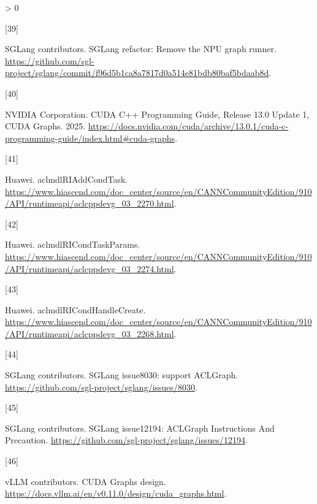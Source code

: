 \documentclass[
  UTF8,
  zihao=5]{ctexart}
\newlength{\cslhangindent}
\newlength{\csllabelwidth}
\newenvironment{CSLReferences}[2] %
 {%
  \setlength{\parindent}{0pt}
  \ifodd #1 \everypar{\setlength{\hangindent}{\cslhangindent}}\ignorespaces\fi
  \ifnum #2 > 0
  \setlength{\parskip}{#2\baselineskip}
  \fi
 }%
 {}
\newcommand{\CSLLeftMargin}[1]{\parbox[t]{\csllabelwidth}{#1}}
\newcommand{\CSLRightInline}[1]{\parbox[t]{\linewidth - \csllabelwidth}{#1}\par}
\begin{document}
\begin{CSLReferences}{0}{0}
\leavevmode{}%
\CSLLeftMargin{{[}39{]} }%
\CSLRightInline{SGLang contributors. {SGLang refactor: Remove the NPU
graph runner}.
\url{https://github.com/sgl-project/sglang/commit/f96d5b1ca8a7817d0a514e81bdb80baf5bdaab8d}.}

\leavevmode{}%
\CSLLeftMargin{{[}40{]} }%
\CSLRightInline{NVIDIA Corporation. CUDA C++ Programming Guide, Release
13.0 Update 1, CUDA Graphs. 2025.
\url{https://docs.nvidia.com/cuda/archive/13.0.1/cuda-c-programming-guide/index.html\#cuda-graphs}.}

\leavevmode{}%
\CSLLeftMargin{{[}41{]} }%
\CSLRightInline{Huawei. {aclmdlRIAddCondTask}.
\url{https://www.hiascend.com/doc_center/source/en/CANNCommunityEdition/910/API/runtimeapi/aclcppdevg_03_2270.html}.}

\leavevmode{}%
\CSLLeftMargin{{[}42{]} }%
\CSLRightInline{Huawei. {aclmdlRICondTaskParams}.
\url{https://www.hiascend.com/doc_center/source/en/CANNCommunityEdition/910/API/runtimeapi/aclcppdevg_03_2274.html}.}

\leavevmode{}%
\CSLLeftMargin{{[}43{]} }%
\CSLRightInline{Huawei. {aclmdlRICondHandleCreate}.
\url{https://www.hiascend.com/doc_center/source/en/CANNCommunityEdition/910/API/runtimeapi/aclcppdevg_03_2268.html}.}

\leavevmode{}%
\CSLLeftMargin{{[}44{]} }%
\CSLRightInline{SGLang contributors. {SGLang issue8030: support
ACLGraph}. \url{https://github.com/sgl-project/sglang/issues/8030}.}

\leavevmode{}%
\CSLLeftMargin{{[}45{]} }%
\CSLRightInline{SGLang contributors. {SGLang issue12194: ACLGraph
Instructions And Precaution}.
\url{https://github.com/sgl-project/sglang/issues/12194}.}

\leavevmode{}%
\CSLLeftMargin{{[}46{]} }%
\CSLRightInline{vLLM contributors. {CUDA Graphs design}.
\url{https://docs.vllm.ai/en/v0.11.0/design/cuda_graphs.html}.}

\end{CSLReferences}
\end{document}

